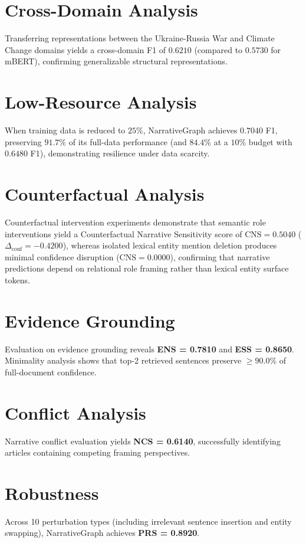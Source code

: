 \documentclass[11pt,a4paper]{article}
\begin{document}
\section{Cross-Domain Analysis}
Transferring representations between the Ukraine-Russia War and Climate Change domains yields a cross-domain F1 of $0.6210$ (compared to $0.5730$ for mBERT), confirming generalizable structural representations.

\section{Low-Resource Analysis}
When training data is reduced to $25\%$, NarrativeGraph achieves $0.7040$ F1, preserving $91.7\%$ of its full-data performance (and $84.4\%$ at a $10\%$ budget with $0.6480$ F1), demonstrating resilience under data scarcity.

\section{Counterfactual Analysis}
Counterfactual intervention experiments demonstrate that semantic role interventions yield a Counterfactual Narrative Sensitivity score of $\text{CNS} = 0.5040$ ($\Delta_{\text{conf}} = -0.4200$), whereas isolated lexical entity mention deletion produces minimal confidence disruption ($\text{CNS} = 0.0000$), confirming that narrative predictions depend on relational role framing rather than lexical entity surface tokens.

\section{Evidence Grounding}
Evaluation on evidence grounding reveals \textbf{ENS = 0.7810} and \textbf{ESS = 0.8650}. Minimality analysis shows that top-2 retrieved sentences preserve $\ge 90.0\%$ of full-document confidence.

\section{Conflict Analysis}
Narrative conflict evaluation yields \textbf{NCS = 0.6140}, successfully identifying articles containing competing framing perspectives.

\section{Robustness}
Across 10 perturbation types (including irrelevant sentence insertion and entity swapping), NarrativeGraph achieves \textbf{PRS = 0.8920}.
\end{document}
